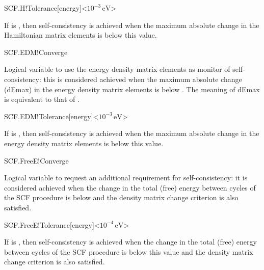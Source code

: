 \begin{fdfentry}{SCF.H!Tolerance}[energy]<$10^{-3}\,\mathrm{eV}$>

  If  is \fdftrue, then self-consistency is
  achieved when the maximum absolute change in the Hamiltonian matrix
  elements is below this value.
  
\end{fdfentry}


\begin{fdflogicalT}{SCF.EDM!Converge}

  Logical variable to use the energy density matrix elements as monitor
  of self-consistency: this is considered achieved when the maximum
  absolute change (dEmax) in the energy density matrix elements is below
  . The meaning of dEmax is equivalent to that
  of .
  
\end{fdflogicalT}

\begin{fdfentry}{SCF.EDM!Tolerance}[energy]<$10^{-3}\,\mathrm{eV}$>

  If  is \fdftrue, then self-consistency is
  achieved when the maximum absolute change in the energy density
  matrix elements is below this value.
  
\end{fdfentry}


\begin{fdflogicalF}{SCF.FreeE!Converge}

  Logical variable to request an additional requirement for
  self-consistency: it is considered achieved when the change in the
  total (free) energy between cycles of the SCF procedure is below
   and the density matrix change criterion is
  also satisfied.

\end{fdflogicalF}

\begin{fdfentry}{SCF.FreeE!Tolerance}[energy]<$10^{-4}\,\mathrm{eV}$>

  If  is \fdftrue, then self-consistency is
  achieved when the change in the total (free) energy between cycles
  of the SCF procedure is below this value and the density matrix
  change criterion is also satisfied.

\end{fdfentry}

